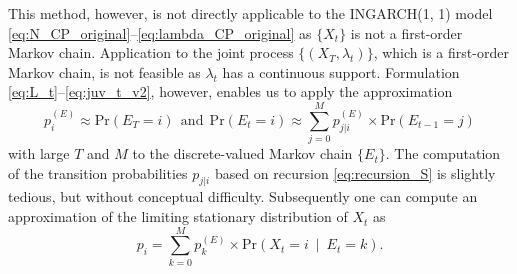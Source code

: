 \documentclass{article}
\begin{document}
This method, however, is not directly applicable to the INGARCH(1, 1) model \eqref{eq:N_CP_original}--\eqref{eq:lambda_CP_original} as $\{X_t\}$ is not a first-order Markov chain. Application to the joint process $\{(X_T, \lambda_t)\}$, which is a first-order Markov chain, is not feasible as $\lambda_t$ has a continuous support. Formulation \eqref{eq:L_t}--\eqref{eq:juv_t_v2}, however, enables us to apply the approximation
$$
p^{(E)}_i \approx \text{Pr}(E_T = i) \ \ \text{and} \ \ \text{Pr}(E_t = i) \approx \sum_{j = 0}^M p^{(E)}_{j|i} \times \text{Pr}(E_{t - 1} = j)
$$
with large $T$ and $M$ to the discrete-valued Markov chain $\{E_t\}$. The computation of the transition probabilities $p_{j|i}$ based on recursion \eqref{eq:recursion_S} is slightly tedious, but without conceptual difficulty. Subsequently one can compute an approximation of the limiting stationary distribution of $X_t$ as
$$
p_i = \sum_{k = 0}^M p_k^{(E)} \times \text{Pr}(X_t = i \ \mid \ E_t = k).
$$





\end{document}
